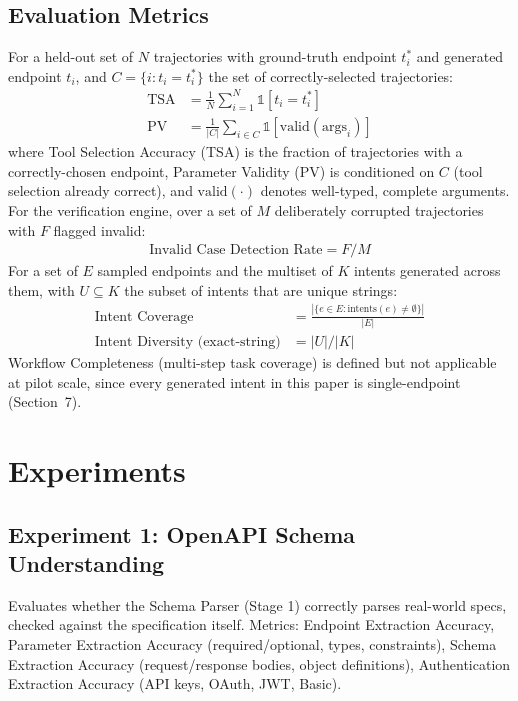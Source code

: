 \documentclass[11pt]{article}
\begin{document}
\subsection{Evaluation Metrics}
For a held-out set of $N$ trajectories with ground-truth endpoint $t_i^*$ and generated endpoint
$t_i$, and $C = \{i : t_i = t_i^*\}$ the set of correctly-selected trajectories:
\begin{align*}
\text{TSA} &= \frac{1}{N}\sum_{i=1}^{N} \mathbb{1}[t_i = t_i^*] \\
\text{PV} &= \frac{1}{|C|}\sum_{i \in C} \mathbb{1}[\mathrm{valid}(\mathrm{args}_i)]
\end{align*}
where Tool Selection Accuracy (TSA) is the fraction of trajectories with a correctly-chosen
endpoint, Parameter Validity (PV) is conditioned on $C$ (tool selection already correct), and
$\mathrm{valid}(\cdot)$ denotes well-typed, complete arguments. For the verification engine, over
a set of $M$ deliberately corrupted trajectories with $F$ flagged invalid:
\begin{align*}
\text{Invalid Case Detection Rate} = F / M
\end{align*}
For a set of $E$ sampled endpoints and the multiset of $K$ intents generated across them, with
$U \subseteq K$ the subset of intents that are unique strings:
\begin{align*}
\text{Intent Coverage} &= \frac{|\{e \in E : \text{intents}(e) \neq \emptyset\}|}{|E|} \\
\text{Intent Diversity (exact-string)} &= |U| / |K|
\end{align*}
Workflow Completeness (multi-step task coverage) is defined but not applicable at pilot scale,
since every generated intent in this paper is single-endpoint (Section~7).

\section{Experiments}

\subsection{Experiment 1: OpenAPI Schema Understanding}
Evaluates whether the Schema Parser (Stage 1) correctly parses real-world specs, checked against
the specification itself. Metrics: Endpoint Extraction Accuracy, Parameter Extraction Accuracy
(required/optional, types, constraints), Schema Extraction Accuracy (request/response bodies,
object definitions), Authentication Extraction Accuracy (API keys, OAuth, JWT, Basic).
\end{document}
